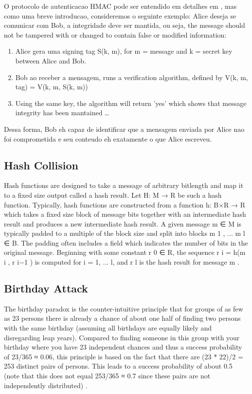 \documentclass[letterpaper,conference]{IEEEtran}
\begin{document}
O protocolo de autenticacao HMAC pode ser entendido em detalhes em \cite{krawczyk1997hmac}, mas como uma breve
introducao, consideremos o seguinte exemplo: Alice deseja se comunicar com Bob, a integridade deve ser
mantida, ou seja, the message should not be tampered with or changed to contain false or modified information:
\begin{enumerate}
\item Alice gera uma signing tag S(k, m), for m = message and k = secret key between Alice and Bob.
\item Bob ao receber a mensagem, runs a verification algorithm, defined by V(k, m, tag) = V(k, m, S(k, m))
\item Using the same key, the algorithm will return 'yes' which shows that message integrity has been mantained \ldots
\end{enumerate}

Dessa forma, Bob eh capaz de identificar que a mensagem enviada por Alice nao foi comprometida e seu conteudo
eh exatamente o que Alice escreveu.

\subsection{Hash Collision}

Hash functions are designed to take a message of arbitrary bitlength and map it to a fixed size
output called a hash result. Let H: M → R be such a hash function. Typically, hash functions are
constructed from a function h: B×R → R which takes a fixed size block of message bits together
with an intermediate hash result and produces a new intermediate hash result. A given message
m ∈ M is typically padded to a multiple of the block size and split into blocks m 1 , ... m l ∈ B. The
padding often includes a field which indicates the number of bits in the original message.
Beginning with some constant r 0 ∈ R, the sequence r i = h(m i , r i−1 ) is computed for i = 1, ... l, and
r l is the hash result for message m \cite{van1999parallel}.

\subsection{Birthday Attack}

The birthday paradox is the counter-intuitive principle that for
groups of as few as 23 persons there is already a chance of about one half of finding two 
persons with the same birthday (assuming all birthdays are equally likely and disregarding 
leap years). Compared to finding someone in this group with your birthday where you have 
23 independent chances and thus a success probability of 23/365 ≈ 0.06, this principle is 
based on the fact that there are (23 * 22)/2 = 253 distinct pairs of persons. This leads to 
a success probability of about 0.5 (note that this does not equal 253/365 ≈ 0.7 since these 
pairs are not independently distributed) \cite{stevens2012attacks}.
\end{document}
